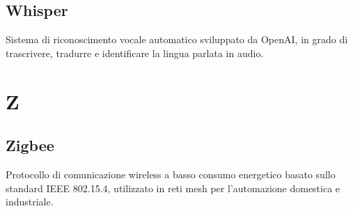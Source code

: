 \documentclass[a4paper,11pt]{article}
\begin{document}
\subsection{Whisper}
Sistema di riconoscimento vocale automatico sviluppato da OpenAI, in grado di trascrivere, tradurre e identificare la lingua parlata in audio.

\newpage
\section{Z}

\subsection{Zigbee}
Protocollo di comunicazione wireless a basso consumo energetico basato sullo standard IEEE 802.15.4, utilizzato in reti mesh per l'automazione domestica e industriale.
\end{document}

